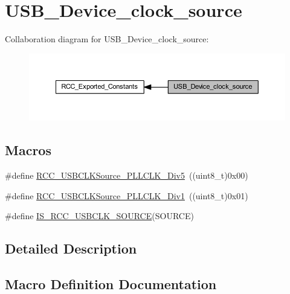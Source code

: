 \hypertarget{group___u_s_b___device__clock__source}{}\section{U\+S\+B\+\_\+\+Device\+\_\+clock\+\_\+source}
\label{group___u_s_b___device__clock__source}
Collaboration diagram for U\+S\+B\+\_\+\+Device\+\_\+clock\+\_\+source\+:
\nopagebreak
\begin{figure}[H]
\begin{center}
\leavevmode
\includegraphics[width=350pt]{group___u_s_b___device__clock__source}
\end{center}
\end{figure}
\subsection*{Macros}
\begin{DoxyCompactItemize}
\item 
\#define \hyperlink{group___u_s_b___device__clock__source_ga5e7a39e25fc37fd2b90edfe66bf1f53f}{R\+C\+C\+\_\+\+U\+S\+B\+C\+L\+K\+Source\+\_\+\+P\+L\+L\+C\+L\+K\+\_\+Div5}~((uint8\+\_\+t)0x00)
\item 
\#define \hyperlink{group___u_s_b___device__clock__source_ga8162727793b5690d6b96ad0cc7ce3866}{R\+C\+C\+\_\+\+U\+S\+B\+C\+L\+K\+Source\+\_\+\+P\+L\+L\+C\+L\+K\+\_\+\+Div1}~((uint8\+\_\+t)0x01)
\item 
\#define \hyperlink{group___u_s_b___device__clock__source_ga484f7834b5506d9879ed84660c894250}{I\+S\+\_\+\+R\+C\+C\+\_\+\+U\+S\+B\+C\+L\+K\+\_\+\+S\+O\+U\+R\+CE}(S\+O\+U\+R\+CE)
\end{DoxyCompactItemize}


\subsection{Detailed Description}


\subsection{Macro Definition Documentation}
\mbox{\label{group___u_s_b___device__clock__source_ga484f7834b5506d9879ed84660c894250}} 
